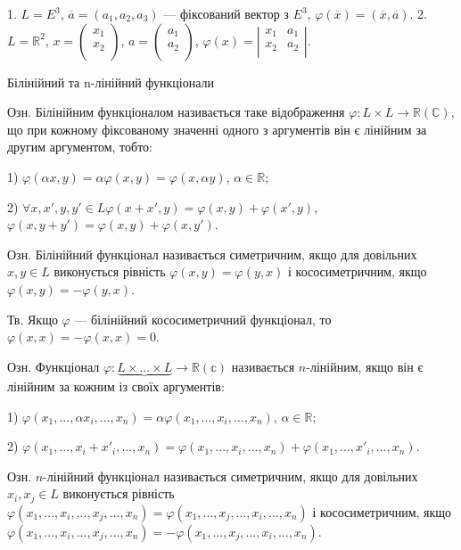 1. $L = E^3$, $\overline{a} = (a_1, a_2, a_3)$ --- фіксований вектор з $E^3$, $\varphi(\overline{x}) = (\overline{x},\overline{a})$.
2. $L = \mathbb{R}^2$, $x = \begin{pmatrix} x_1 \\ x_2 \\ \end{pmatrix}$, $a = \begin{pmatrix} a_1 \\ a_2 \\ \end{pmatrix}$,
$\varphi(x) = \left|\begin{matrix} x_1 & a_1 \\ x_2 & a_2 \\ \end{matrix}\right|$.


Білінійний та n-лінійний функціонали


Озн. Білінійним функціоналом називається таке відображення
$\varphi: L \times L \rightarrow \mathbb{R} (\mathbb{C})$, що при кожному фіксованому значенні одного з
аргументів він є лінійним за другим аргументом, тобто:

1) $\varphi(\alpha x, y) = \alpha \varphi(x, y) = \varphi(x,\alpha y)$, $\alpha \in \mathbb{R}$;

2) $\forall x, x', y, y' \in L \varphi(x + x',y) = \varphi(x,y) + \varphi(x',y)$,
$\varphi(x,y + y') = \varphi(x,y) + \varphi(x,y')$.


Озн. Білінійний функціонал називається симетричним, якщо для довільних
$x, y \in L$ виконується рівність $\varphi(x,y) = \varphi(y,x)$ і кососиметричним, якщо
$\varphi(x,y) = - \varphi(y,x)$.


Тв. Якщо $\varphi$ --- білінійний кососиметричний функціонал, то
$\varphi(x,x) = - \varphi(x,x) = 0$.


Озн. Функціонал $\varphi: \underbrace{L \times ... \times L} \rightarrow \mathbb{R}(\mathbb{c})$
називається $n$-лінійним, якщо він є
лінійним за кожним із своїх аргументів:

1) $\varphi(x_1, ..., \alpha x_i, ..., x_n) = \alpha \varphi(x_1, ..., x_i, ..., x_n)$, $\alpha \in \mathbb{R}$;

2) $\varphi(x_1, ..., x_i + x'_i, ..., x_n) = \varphi(x_1, ..., x_i, ..., x_n) + \varphi(x_1, ..., x'_i, ..., x_n)$.


Озн. $n$-лінійний функціонал називається симетричним, якщо для довільних
$x_i, x_j \in L$ виконується рівність  $\varphi(x_1, ..., x_i, ..., x_j, ..., x_n) = \varphi(x_1, ..., x_j, ..., x_i, ..., x_n)$
і кососиметричним, якщо $\varphi(x_1, ..., x_i, ..., x_j, ..., x_n) = - \varphi(x_1, ..., x_j, ..., x_i, ..., x_n)$.

